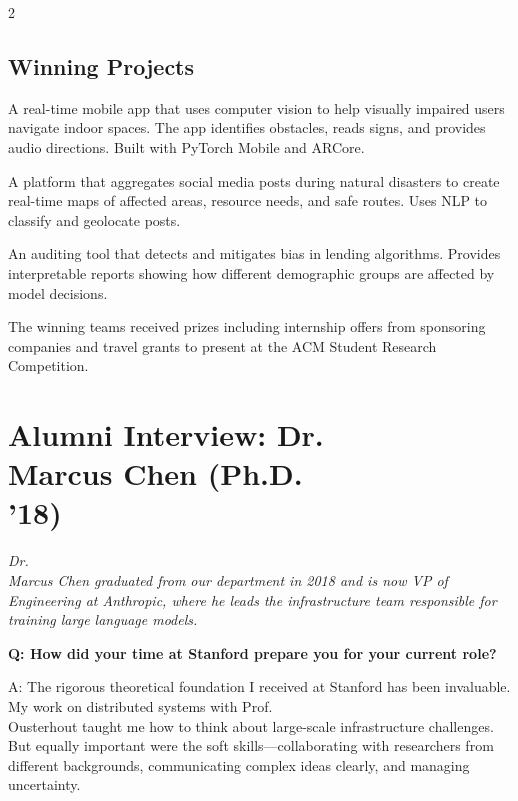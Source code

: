 \documentclass[10pt,a4paper]{article}
\begin{document}
\begin{multicols}{2}
\subsection{Winning Projects}

\begin{description}[leftmargin=0em, style=nextline, itemsep=4pt]
  \item[1st Place -- ``AccessiVision'' (Team Alpha)]
  A real-time mobile app that uses computer vision to help visually impaired users navigate indoor spaces. The app identifies obstacles, reads signs, and provides audio directions. Built with PyTorch Mobile and ARCore.

  \item[2nd Place -- ``CrisisMap'' (Team Resilience)]
  A platform that aggregates social media posts during natural disasters to create real-time maps of affected areas, resource needs, and safe routes. Uses NLP to classify and geolocate posts.

  \item[3rd Place -- ``FairLend'' (Team Justice)]
  An auditing tool that detects and mitigates bias in lending algorithms. Provides interpretable reports showing how different demographic groups are affected by model decisions.
\end{description}

The winning teams received prizes including internship offers from sponsoring companies and travel grants to present at the ACM Student Research Competition.

\columnbreak

\section{Alumni Interview: Dr.\\ Marcus Chen (Ph.D.\\ '18)}

\textit{Dr.\\ Marcus Chen graduated from our department in 2018 and is now VP of Engineering at Anthropic, where he leads the infrastructure team responsible for training large language models.}

\textbf{Q: How did your time at Stanford prepare you for your current role?}

A: The rigorous theoretical foundation I received at Stanford has been invaluable. My work on distributed systems with Prof.\\ Ousterhout taught me how to think about large-scale infrastructure challenges. But equally important were the soft skills---collaborating with researchers from different backgrounds, communicating complex ideas clearly, and managing uncertainty.


\end{multicols}
\end{document}
